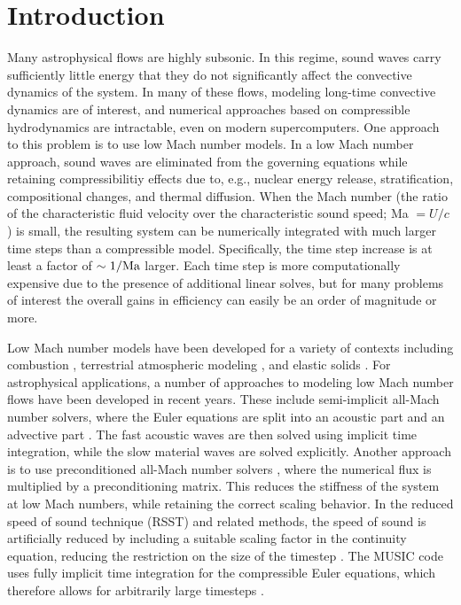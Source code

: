 \section{Introduction} \label{sec:intro}
Many astrophysical flows are highly subsonic.  In this regime,
sound waves carry sufficiently little energy that they do not
significantly affect the convective dynamics of the system.  In many
of these flows, modeling long-time convective dynamics are of
interest, and numerical approaches based on compressible hydrodynamics
are intractable, even on modern supercomputers.  One approach to this
problem is to use low Mach number models.  In a low Mach number
approach, sound waves are eliminated from the governing equations
while retaining compressibilitiy effects due to, e.g., nuclear energy
release, stratification, compositional changes, and thermal diffusion.  When the Mach
number (the ratio of the characteristic fluid velocity over the
characteristic sound speed; Ma $= U/c$) is small, the resulting system
can be numerically integrated with much larger time steps than a
compressible model.  Specifically, the time step increase is at least
a factor of $\sim 1/{\rm Ma}$ larger.  Each time step is more
computationally expensive due to the presence of additional linear
solves, but for many problems of interest the overall gains in
efficiency can easily be an order of magnitude or more.

Low Mach number models have been developed for a variety of contexts including combustion \citep{day2000numerical}, terrestrial atmospheric modeling \citep{duarte2015low},
and elastic solids \citep{abbate2017all}.
For astrophysical applications, a number of approaches to modeling low Mach number flows have been developed in recent years.
These include semi-implicit all-Mach number solvers, where the Euler equations are split into an acoustic part and an advective part \citep{Kwatra2009,Degond2009,Cordier2012,Haack2012,Happenhofer2013,Chalons2016,Padioleau2019}.
The fast acoustic waves are then solved using implicit time integration, while the slow material waves are solved explicitly.
Another approach is to use preconditioned all-Mach number solvers \citep{Miczek2014,Barsukow2016}, where the numerical flux is multiplied by a preconditioning matrix.
This reduces the stiffness of the system at low Mach numbers, while retaining the correct scaling behavior. In the reduced speed of sound technique (RSST) and related methods, the speed of sound is artificially reduced by including a suitable scaling factor in the continuity equation, reducing the restriction on the size of the timestep \citep{Rempel2005,Hotta2012,Wang2015,Takeyama2017,Iijima2018}.
The MUSIC code uses fully implicit time integration for the compressible Euler equations, which therefore allows for arbitrarily large timesteps \citep{Viallet2011,Viallet2015,Goffrey2016}.

